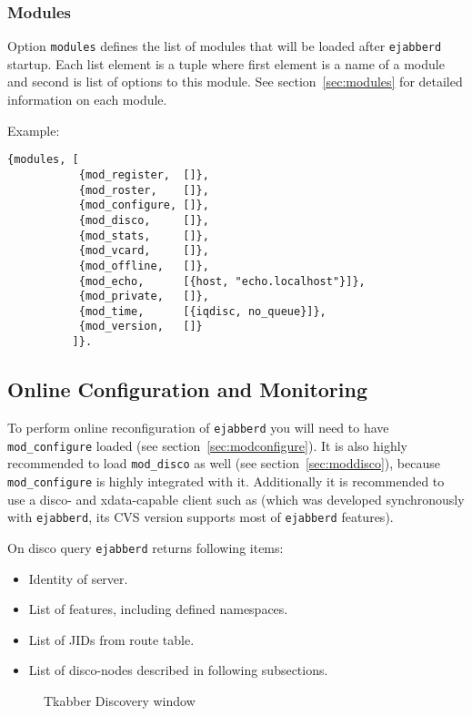 \documentclass[10pt]{article}
\newcommand{\imgscale}{0.58}
\newcommand{\insimg}[1]{\insscaleimg{\imgscale}{#1}}
\newcommand{\insscaleimg}[2]{
  \imgsrc{#2}{}
  \begin{latexonly}
    \scalebox{#1}{\texttt{[image: \#2]}}
  \end{latexonly}
}
\newcommand{\ejabberd}{\texttt{ejabberd}}
\newcommand{\modconfigure}{\texttt{mod\_configure}}
\newcommand{\moddisco}{\texttt{mod\_disco}}
\begin{document}
\subsubsection{Modules}
\label{sec:configmodules}

Option \texttt{modules} defines the list of modules that will be loaded after
\ejabberd{} startup.  Each list element is a tuple where first element is a
name of a module and second is list of options to this module.  See
section~\ref{sec:modules} for detailed information on each module.

Example:
\begin{verbatim}
{modules, [
           {mod_register,  []},
           {mod_roster,    []},
           {mod_configure, []},
           {mod_disco,     []},
           {mod_stats,     []},
           {mod_vcard,     []},
           {mod_offline,   []},
           {mod_echo,      [{host, "echo.localhost"}]},
           {mod_private,   []},
           {mod_time,      [{iqdisc, no_queue}]},
           {mod_version,   []}
          ]}.
\end{verbatim}


\subsection{Online Configuration and Monitoring}
\label{sec:onlineconfig}

To perform online reconfiguration of \ejabberd{} you will need to have
\modconfigure{} loaded (see section~\ref{sec:modconfigure}). It is also highly
recommended to load \moddisco{} as well (see section~\ref{sec:moddisco}),
because \modconfigure{} is highly integrated with it.  Additionally it is
recommended to use a disco- and xdata-capable client such as
(which was developed synchronously with \ejabberd{}, its CVS version
supports most of \ejabberd{} features).




On disco query \ejabberd{} returns following items:
\begin{itemize}
\item Identity of server.
\item List of features, including defined namespaces.
\item List of JIDs from route table.
\item List of disco-nodes described in following subsections.
\end{itemize}
\begin{figure}[htbp]
  \centering
  \insimg{disco.png}
  \caption{Tkabber Discovery window}
  \label{fig:disco}
\end{figure}
\end{document}

